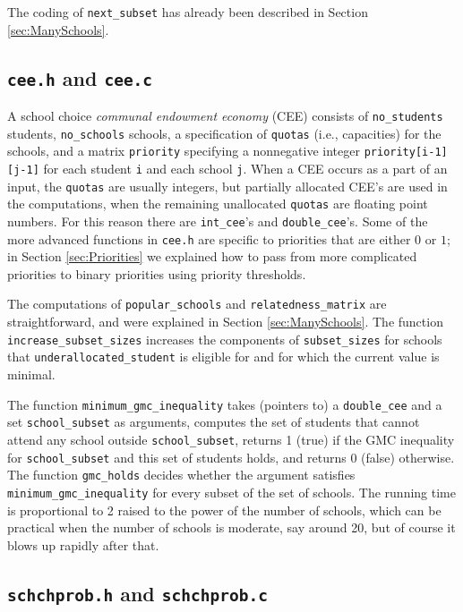 \documentclass[12pt]{article}
\theoremstyle{definition}
\begin{document}
\begin{appendix}
The coding of \texttt{next\_subset} has already been described in Section \ref{sec:ManySchools}.

\subsection{\texttt{cee.h} and \texttt{cee.c}}

A school choice \emph{communal endowment economy} (CEE) consists of
\texttt{no\_students} students, \texttt{no\_schools} schools, a
specification of \texttt{quotas} (i.e., capacities) for the schools,
and a matrix \texttt{priority} specifying a nonnegative integer
\texttt{priority[i-1][j-1]} for each student \texttt{i} and each
school \texttt{j}.  When a CEE occurs as a part of an input, the
\texttt{quotas} are usually integers, but partially allocated CEE's
are used in the computations, when the remaining unallocated
\texttt{quotas} are floating point numbers.  For this reason there are
\texttt{int\_cee}'s and \texttt{double\_cee}'s.  Some of the more
advanced functions in \texttt{cee.h} are specific to priorities that
are either $0$ or $1$; in Section \ref{sec:Priorities} we explained
how to pass from more complicated priorities to binary priorities
using priority thresholds.

The computations of \texttt{popular\_schools} and
\texttt{relatedness\_matrix} are straightforward, and were explained
in Section \ref{sec:ManySchools}.  The function
\texttt{increase\_subset\_sizes} increases the components of
\texttt{subset\_sizes} for schools that
\texttt{underallocated\_student} is eligible for and for which the
current value is minimal.

The function \texttt{minimum\_gmc\_inequality} takes (pointers to) a
\texttt{double\_cee} and a set \texttt{school\_subset} as arguments,
computes the set of students that cannot attend any school outside
\texttt{school\_subset}, returns 1 (true) if the GMC inequality for
\texttt{school\_subset} and this set of students holds, and returns 0
(false) otherwise. The function \texttt{gmc\_holds} decides whether
the argument satisfies \texttt{minimum\_gmc\_inequality} for every
subset of the set of schools.  The running time is proportional to 2
raised to the power of the number of schools, which can be practical
when the number of schools is moderate, say around 20, but of course
it blows up rapidly after that.

\subsection{\texttt{schchprob.h} and \texttt{schchprob.c}}


\end{appendix}
\end{document}
